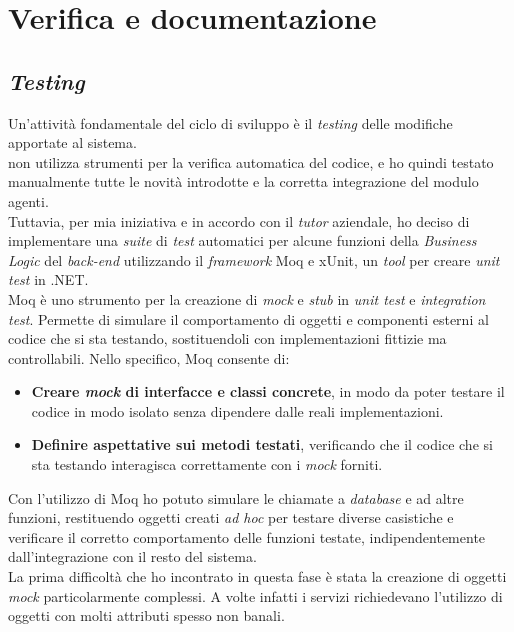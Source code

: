 \section{Verifica e documentazione}\label{chap:verifica}
\subsection{\textit{Testing}}
Un'attività fondamentale del ciclo di sviluppo è il \textit{testing} delle modifiche apportate al sistema.\\
{\company} non utilizza strumenti per la verifica automatica del codice, e ho quindi testato manualmente tutte 
le novità introdotte e la corretta integrazione del modulo agenti.\\
Tuttavia, per mia iniziativa e in accordo con il \textit{tutor} aziendale, ho deciso di implementare una \textit{suite} di 
\textit{test} automatici per alcune funzioni della \textit{Business Logic} del \textit{back-end} utilizzando il \textit{framework} 
Moq e xUnit, un \textit{tool} per creare \textit{unit test} in .NET.\\
Moq è uno strumento per la creazione di \textit{mock} e \textit{stub} in \textit{unit test} 
e \textit{integration test}. Permette di simulare il comportamento di oggetti e componenti esterni al codice che si sta 
testando, sostituendoli con implementazioni fittizie ma controllabili. Nello specifico, Moq consente di:
\begin{itemize}
    \item \textbf{Creare \textit{mock} di interfacce e classi concrete}, in modo da poter testare il codice in modo isolato 
          senza dipendere dalle reali implementazioni.
    \item \textbf{Definire aspettative sui metodi testati}, verificando che il codice che si sta testando 
          interagisca correttamente con i \textit{mock} forniti.
\end{itemize}
Con l'utilizzo di Moq ho potuto simulare le chiamate a \textit{database} e ad altre funzioni, restituendo oggetti creati \textit{ad hoc}
per testare diverse casistiche e verificare il corretto comportamento delle funzioni testate, indipendentemente 
dall'integrazione con il resto del sistema.\\
La prima difficoltà che ho incontrato in questa fase è stata la creazione di oggetti \textit{mock} particolarmente 
complessi. A volte infatti i servizi richiedevano l'utilizzo di oggetti con molti attributi spesso non banali.\\
